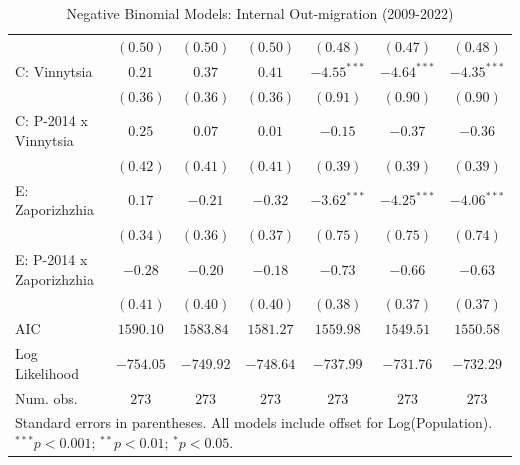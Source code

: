 \begin{table}
\begin{center}
\begin{small}
\begin{tabular}{l c c c c c c}
                            & $(0.50)$      & $(0.50)$       & $(0.50)$       & $(0.48)$       & $(0.47)$       & $(0.48)$       \\
C: Vinnytsia                & $0.21$        & $0.37$         & $0.41$         & $-4.55^{***}$  & $-4.64^{***}$  & $-4.35^{***}$  \\
                            & $(0.36)$      & $(0.36)$       & $(0.36)$       & $(0.91)$       & $(0.90)$       & $(0.90)$       \\
C: P-2014 x Vinnytsia       & $0.25$        & $0.07$         & $0.01$         & $-0.15$        & $-0.37$        & $-0.36$        \\
                            & $(0.42)$      & $(0.41)$       & $(0.41)$       & $(0.39)$       & $(0.39)$       & $(0.39)$       \\
E: Zaporizhzhia             & $0.17$        & $-0.21$        & $-0.32$        & $-3.62^{***}$  & $-4.25^{***}$  & $-4.06^{***}$  \\
                            & $(0.34)$      & $(0.36)$       & $(0.37)$       & $(0.75)$       & $(0.75)$       & $(0.74)$       \\
E: P-2014 x Zaporizhzhia    & $-0.28$       & $-0.20$        & $-0.18$        & $-0.73$        & $-0.66$        & $-0.63$        \\
                            & $(0.41)$      & $(0.40)$       & $(0.40)$       & $(0.38)$       & $(0.37)$       & $(0.37)$       \\
\hline
AIC                         & $1590.10$     & $1583.84$      & $1581.27$      & $1559.98$      & $1549.51$      & $1550.58$      \\
Log Likelihood              & $-754.05$     & $-749.92$      & $-748.64$      & $-737.99$      & $-731.76$      & $-732.29$      \\
Num. obs.                   & $273$         & $273$          & $273$          & $273$          & $273$          & $273$          \\
\hline
\multicolumn{7}{l}{\tiny{Standard errors in parentheses. All models include offset for Log(Population). $^{***}p<0.001$; $^{**}p<0.01$; $^{*}p<0.05$.}}
\end{tabular}
\end{small}
\caption{Negative Binomial Models: Internal Out-migration (2009-2022)}
\label{tab:out_migration}
\end{center}
\end{table}
